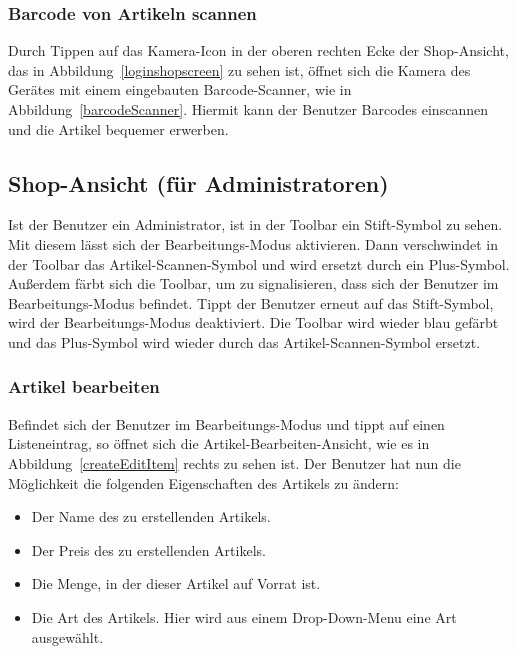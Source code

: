 
\subsubsection{Barcode von Artikeln scannen} \label{subsubsec:shop-scan-item}

Durch Tippen auf das Kamera-Icon in der oberen rechten Ecke der Shop-Ansicht, das in Abbildung~\ref{loginshopscreen} zu sehen ist, öffnet sich die Kamera des Gerätes mit einem eingebauten Barcode-Scanner, wie in Abbildung~\ref{barcodeScanner}.
Hiermit kann der Benutzer Barcodes einscannen und die Artikel bequemer erwerben.


\subsection{Shop-Ansicht (für Administratoren)} \label{subsec:shop-screen-admin}

Ist der Benutzer ein Administrator, ist in der Toolbar ein Stift-Symbol zu sehen.
Mit diesem lässt sich der Bearbeitungs-Modus aktivieren.
Dann verschwindet in der Toolbar das Artikel-Scannen-Symbol und wird ersetzt durch ein Plus-Symbol.
Außerdem färbt sich die Toolbar, um zu signalisieren, dass sich der Benutzer im Bearbeitungs-Modus befindet.
Tippt der Benutzer erneut auf das Stift-Symbol, wird der Bearbeitungs-Modus deaktiviert.
Die Toolbar wird wieder blau gefärbt und das Plus-Symbol wird wieder durch das Artikel-Scannen-Symbol ersetzt.

\subsubsection{Artikel bearbeiten} \label{subsubsec:shop-edit-items}

Befindet sich der Benutzer im Bearbeitungs-Modus und tippt auf einen Listeneintrag, so öffnet sich die Artikel-Bearbeiten-Ansicht, wie es in Abbildung~\ref{createEditItem} rechts zu sehen ist.
Der Benutzer hat nun die Möglichkeit die folgenden Eigenschaften des Artikels zu ändern:

\begin{itemize}
	\item Der Name des zu erstellenden Artikels.

	\item Der Preis des zu erstellenden Artikels.

	\item Die Menge, in der dieser Artikel auf Vorrat ist.

	\item Die Art des Artikels.
	Hier wird aus einem Drop-Down-Menu eine Art ausgewählt.
\end{itemize}

